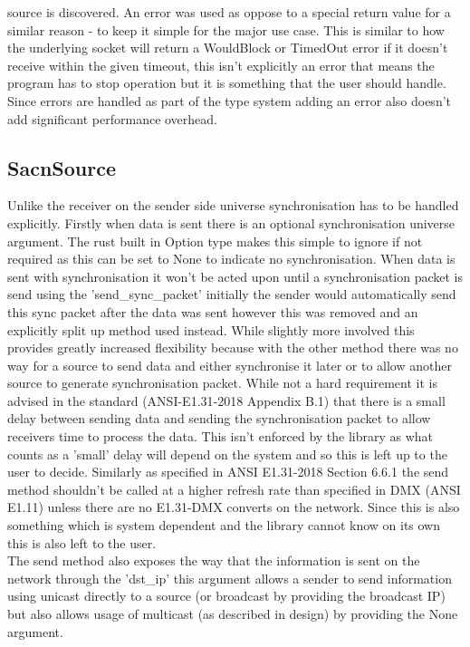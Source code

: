 \documentclass[11pt,a4paper]{report}
\begin{document}
source is discovered. An error was used as oppose to a special return value for a similar reason - to keep it simple for the major use case. This is similar to how the underlying socket will return a WouldBlock or TimedOut error if it doesn't receive within the given timeout, this isn't explicitly an error that means the program has to stop operation but it is something that the user should handle. Since errors are handled as part of the type system adding an error also doesn't add significant performance overhead. \\
	 
\subsection{SacnSource}
Unlike the receiver on the sender side universe synchronisation has to be handled explicitly. Firstly when data is sent there is an optional synchronisation universe argument. The rust built in Option type makes this simple to ignore if not required as this can be set to None to indicate no synchronisation. When data is sent with synchronisation it won't be acted upon until a synchronisation packet is send using the 'send\_sync\_packet' initially the sender would automatically send this sync packet after the data was sent however this was removed and an explicitly split up method used instead. While slightly more involved this provides greatly increased flexibility because with the other method there was no way for a source to send data and either synchronise it later or to allow another source to generate synchronisation packet. While not a hard requirement it is advised in the standard (ANSI-E1.31-2018 Appendix B.1) that there is a small delay between sending data and sending the synchronisation packet to allow receivers time to process the data. This isn't enforced by the library as what counts as a 'small' delay will depend on the system and so this is left up to the user to decide. Similarly as specified in ANSI E1.31-2018 Section 6.6.1 the send method shouldn't be called at a higher refresh rate than specified in DMX (ANSI E1.11) unless there are no E1.31-DMX converts on the network. Since this is also something which is system dependent and the library cannot know on its own this is also left to the user.\\
	
The send method also exposes the way that the information is sent on the network through the 'dst\_ip' this argument allows a sender to send information using unicast directly to a source (or broadcast by providing the broadcast IP) but also allows usage of multicast (as described in design) by providing the None argument. \\
	
\end{document}
